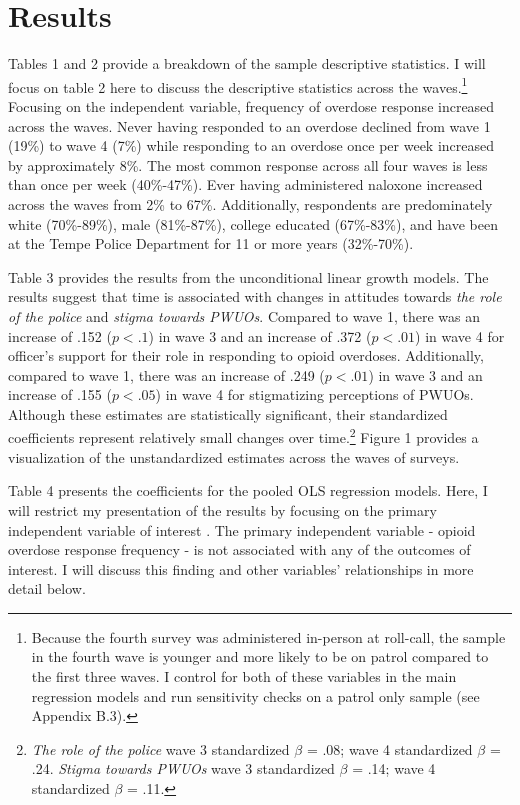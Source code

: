 \section{Results}
Tables 1 and 2 provide a breakdown of the sample descriptive statistics. I will focus on table 2 here to discuss the descriptive statistics across the waves.\footnote{Because the fourth survey was administered in-person at roll-call, the sample in the fourth wave is younger and more likely to be on patrol compared to the first three waves. I control for both of these variables in the main regression models and run sensitivity checks on a patrol only sample (see Appendix B.3).} Focusing on the independent variable, frequency of overdose response increased across the waves. Never having responded to an overdose declined from wave 1 (19\%) to wave 4 (7\%) while responding to an overdose once per week increased by approximately 8\%. The most common response across all four waves is less than once per week (40\%-47\%). Ever having administered naloxone increased across the waves from 2\% to 67\%. Additionally, respondents are predominately white (70\%-89\%), male (81\%-87\%), college educated (67\%-83\%), and have been at the Tempe Police Department for 11 or more years (32\%-70\%).

Table 3 provides the results from the unconditional linear growth models. The results suggest that time is associated with changes in attitudes towards \textit{the role of the police} and \textit{stigma towards PWUOs}. Compared to wave 1, there was an increase of .152 (\(p < .1\)) in wave 3 and an increase of .372 (\(p < .01\)) in wave 4 for officer's support for their role in responding to opioid overdoses. Additionally, compared to wave 1, there was an increase of .249 (\(p < .01\)) in wave 3 and an increase of .155 (\(p < .05\)) in wave 4 for stigmatizing perceptions of PWUOs. Although these estimates are statistically significant, their standardized coefficients represent relatively small changes over time.\footnote{\textit{The role of the police} wave 3 standardized \(\beta\) = .08; wave 4 standardized \(\beta\) = .24. \textit{Stigma towards PWUOs} wave 3 standardized \(\beta\) = .14; wave 4 standardized \(\beta\) = .11.} Figure 1 provides a visualization of the unstandardized estimates across the waves of surveys. 

Table 4 presents the coefficients for the pooled OLS regression models. Here, I will restrict my presentation of the results by focusing on the primary independent variable of interest \parencite{keele_causal_2020}. The primary independent variable - opioid overdose response frequency - is not associated with any of the outcomes of interest. I will discuss this finding and other variables' relationships in more detail below. 

